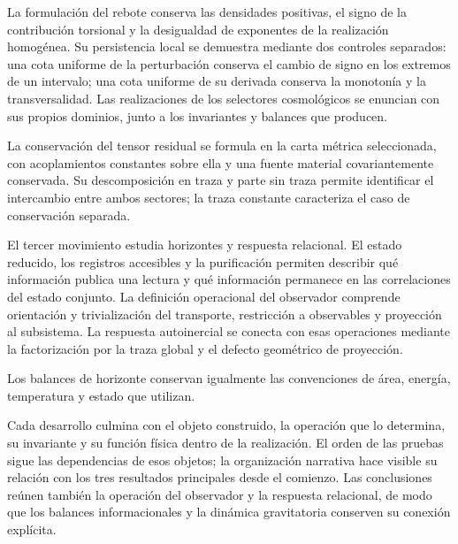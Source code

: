 La formulación del rebote conserva las densidades positivas, el signo de
la contribución torsional y la desigualdad de exponentes de la realización
homogénea. Su persistencia local se demuestra mediante dos controles
separados: una cota uniforme de la perturbación conserva el cambio de
signo en los extremos de un intervalo; una cota uniforme de su derivada
conserva la monotonía y la transversalidad. Las realizaciones de los
selectores cosmológicos se enuncian con sus propios dominios, junto a los
invariantes y balances que producen.

La conservación del tensor residual se formula en la carta métrica
seleccionada, con acoplamientos constantes sobre ella y una fuente
material covariantemente conservada. Su descomposición en traza y parte
sin traza permite identificar el intercambio entre ambos sectores;
la traza constante caracteriza el caso de conservación separada.

El tercer movimiento estudia horizontes y respuesta relacional. El estado
reducido, los registros accesibles y la purificación permiten describir
qué información publica una lectura y qué información permanece en las
correlaciones del estado conjunto. La definición operacional del
observador comprende orientación y trivialización del transporte,
restricción a observables y proyección al subsistema. La respuesta
autoinercial se conecta con esas operaciones mediante la factorización
por la traza global y el defecto geométrico de proyección.

Los balances de horizonte conservan igualmente las convenciones de
área, energía, temperatura y estado que utilizan.

Cada desarrollo culmina con el objeto construido, la operación que lo
determina, su invariante y su función física dentro de la realización.
El orden de las pruebas sigue las dependencias de esos objetos; la
organización narrativa hace visible su relación con los tres resultados
principales desde el comienzo. Las conclusiones reúnen también la
operación del observador y la respuesta relacional, de modo que los
balances informacionales y la dinámica gravitatoria conserven su
conexión explícita.

